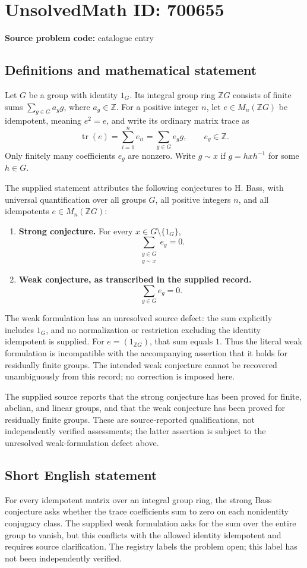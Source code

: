 \documentclass[11pt]{article}
\newcommand{\Z}{\mathbb{Z}}
\begin{document}
\section*{UnsolvedMath ID: 700655}
\textbf{Source problem code:} catalogue entry
\subsection{Definitions and mathematical statement}
Let \(G\) be a group with identity \(1_G\). Its integral group ring \(\Z G\) consists of finite sums \(\sum_{g\in G}a_g g\), where \(a_g\in\Z\). For a positive integer \(n\), let \(e\in M_n(\Z G)\) be idempotent, meaning \(e^2=e\), and write its ordinary matrix trace as
\[
\operatorname{tr}(e)=\sum_{i=1}^{n}e_{ii}=\sum_{g\in G}e_g g,\qquad e_g\in\Z.
\]
Only finitely many coefficients \(e_g\) are nonzero. Write \(g\sim x\) if \(g=hxh^{-1}\) for some \(h\in G\).

The supplied statement attributes the following conjectures to H. Bass, with universal quantification over all groups \(G\), all positive integers \(n\), and all idempotents \(e\in M_n(\Z G)\):
\begin{enumerate}
\item \textbf{Strong conjecture.} For every \(x\in G\setminus\{1_G\}\),
\[
\sum_{\substack{g\in G\\g\sim x}}e_g=0.
\]
\item \textbf{Weak conjecture, as transcribed in the supplied record.}
\[
\sum_{g\in G}e_g=0.
\]
\end{enumerate}
The weak formulation has an unresolved source defect: the sum explicitly includes \(1_G\), and no normalization or restriction excluding the identity idempotent is supplied. For \(e=(1_{\Z G})\), that sum equals \(1\). Thus the literal weak formulation is incompatible with the accompanying assertion that it holds for residually finite groups. The intended weak conjecture cannot be recovered unambiguously from this record; no correction is imposed here.

The supplied source reports that the strong conjecture has been proved for finite, abelian, and linear groups, and that the weak conjecture has been proved for residually finite groups. These are source-reported qualifications, not independently verified assessments; the latter assertion is subject to the unresolved weak-formulation defect above.
\subsection{Short English statement}
For every idempotent matrix over an integral group ring, the strong Bass conjecture asks whether the trace coefficients sum to zero on each nonidentity conjugacy class. The supplied weak formulation asks for the sum over the entire group to vanish, but this conflicts with the allowed identity idempotent and requires source clarification. The registry labels the problem open; this label has not been independently verified.
\end{document}
